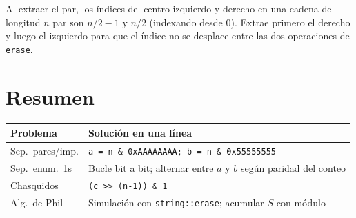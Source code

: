\documentclass[12pt, oneside]{article}
\begin{document}
\begin{consejo}
  Al extraer el par, los índices del centro izquierdo y derecho en una cadena
  de longitud $n$ par son $n/2 - 1$ y $n/2$ (indexando desde 0).
  Extrae primero el derecho y luego el izquierdo para que el índice no
  se desplace entre las dos operaciones de \texttt{erase}.
\end{consejo}

\section{Resumen}

\begin{center}
\begin{tabular}{lp{8.5cm}}
  \toprule
  \textbf{Problema} & \textbf{Solución en una línea} \\
  \midrule
  Sep.\ pares/imp. & \texttt{a = n \& 0xAAAAAAAA;\ b = n \& 0x55555555} \\[4pt]
  Sep.\ enum.\ 1s  & Bucle bit a bit; alternar entre $a$ y $b$ según paridad del conteo \\[4pt]
  Chasquidos       & \texttt{(c >> (n-1)) \& 1} \\[4pt]
  Alg.\ de Phil    & Simulación con \texttt{string::erase}; acumular $S$ con módulo \\
  \bottomrule
\end{tabular}
\end{center}
\end{document}
